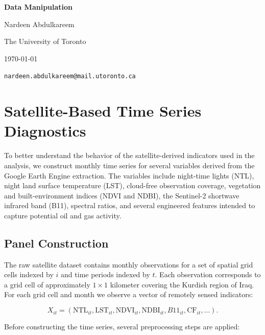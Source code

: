 \documentclass[12pt]{article}
\begin{document}
\begin{titlepage}
    \thispagestyle{empty} %
    \centering
    \vspace*{\fill}

    {\Large \textbf{Data Manipulation} \par}

    \vspace{3em}
    {\large Nardeen Abdulkareem \par}
    {\normalsize The University of Toronto \par}
    {\normalsize \today \par}
    {\texttt{nardeen.abdulkareem@mail.utoronto.ca} \par}

    \vspace*{\fill}
\end{titlepage}
\clearpage

\section{Satellite-Based Time Series Diagnostics}

To better understand the behavior of the satellite-derived indicators used in the analysis, we construct monthly time series for several variables derived from the Google Earth Engine extraction. The variables include night-time lights (NTL), night land surface temperature (LST), cloud-free observation coverage, vegetation and built-environment indices (NDVI and NDBI), the Sentinel-2 shortwave infrared band (B11), spectral ratios, and several engineered features intended to capture potential oil and gas activity.

\subsection{Panel Construction}

The raw satellite dataset contains monthly observations for a set of spatial grid cells indexed by $i$ and time periods indexed by $t$. Each observation corresponds to a grid cell of approximately $1 \times 1$ kilometer covering the Kurdish region of Iraq. For each grid cell and month we observe a vector of remotely sensed indicators:

\[
X_{it} = \left( \text{NTL}_{it}, \text{LST}_{it}, \text{NDVI}_{it}, \text{NDBI}_{it}, B11_{it}, \text{CF}_{it}, \ldots \right).
\]

Before constructing the time series, several preprocessing steps are applied:
\end{document}

